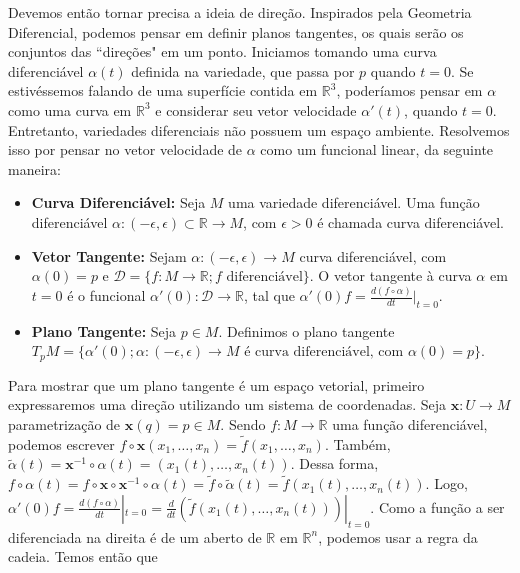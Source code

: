 Devemos então tornar precisa a ideia de direção.
Inspirados pela Geometria Diferencial, podemos pensar em definir planos tangentes, os quais serão os conjuntos das ``direções" em um ponto. Iniciamos tomando uma curva diferenciável $\alpha(t)$ definida na variedade, que passa por $p$ quando $t=0$. Se estivéssemos falando de uma superfície contida em $\mathbb{R}^{3}$, poderíamos pensar em $\alpha$ como uma curva em $\mathbb{R}^{3}$ e considerar seu vetor velocidade $\alpha'(t)$, quando $t=0$. Entretanto, variedades diferenciais não possuem um espaço ambiente. Resolvemos isso por pensar no vetor velocidade de $\alpha$ como um funcional linear, da seguinte maneira:
\begin{definition}
    \label{loc:2.6_:_def_3_:_vetor_e_plano_tangente.definições}
    \begin{itemize}
        \item \textbf{Curva Diferenciável:} Seja $M$ uma variedade diferenciável. Uma função diferenciável $\alpha:(-\epsilon, \epsilon) \subset \mathbb{R} \to M$, com $\epsilon>0$ é chamada curva diferenciável.
        \item \textbf{Vetor Tangente:} Sejam $\alpha:(-\epsilon, \epsilon)\to M$ curva diferenciável, com $\alpha(0)=p$ e $\mathcal{D}=\{ f:M\to \mathbb{R}; f \text{ diferenciável} \}$. O vetor tangente à curva $\alpha$ em $t=0$ é o funcional $\alpha'(0):\mathcal{D}\to \mathbb{R}$, tal que $\alpha'(0)f=\frac{d(f\circ\alpha)}{dt}|_{t=0}$.
        \item \textbf{Plano Tangente: }Seja $p \in M$. Definimos o plano tangente $T_{p}M=\{ \alpha'(0); \alpha:(-\epsilon, \epsilon)\to M \text{ é curva diferenciável, com } \alpha(0)=p \}$.
    \end{itemize}
\end{definition}
Para mostrar que um plano tangente é um espaço vetorial, primeiro expressaremos uma direção utilizando um sistema de coordenadas.
Seja $\mathbf{x}:U\to M$ parametrização de $\mathbf{x}(q)=p \in M$. Sendo $f:M\to \mathbb{R}$ uma função diferenciável, podemos escrever $f \circ \mathbf{x}(x_{1}, \dots, x_{n})=\tilde{f}(x_{1}, \dots, x_{n})$. Também, $\tilde{\alpha}(t)=\mathbf{x}^{-1}\circ\alpha(t)=(x_{1}(t), \dots, x_{n}(t))$.
Dessa forma, $f \circ \alpha(t) = f \circ \mathbf{x} \circ \mathbf{x}^{-1} \circ \alpha(t) = \tilde{f} \circ \tilde{\alpha}(t) = \tilde{f}(x_{1}(t), \dots, x_{n}(t))$.
Logo, $\alpha'(0)f=\frac{d(f\circ\alpha)}{dt}|_{t=0} = \frac{d}{dt}(\tilde{f}(x_{1}(t), \dots, x_{n}(t)))|_{t=0}$.
Como a função a ser diferenciada na direita é de um aberto de $\mathbb{R}$ em $\mathbb{R}^{n}$, podemos usar a regra da cadeia. Temos então que
